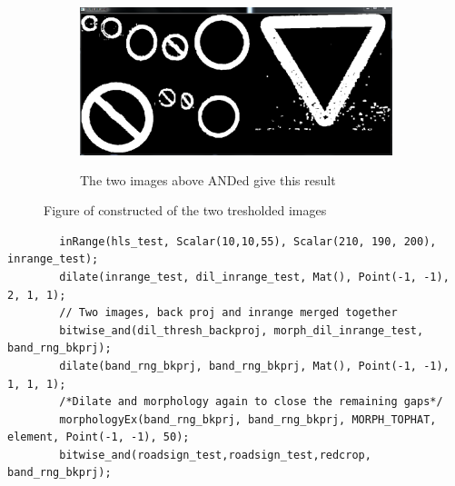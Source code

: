 \documentclass{article}
\begin{document}
\begin{figure}[H]
\center
\begin{subfigure}{0.5\textwidth}
\includegraphics[width=0.9\linewidth, height=5cm]{N_BIT_AND.PNG} 
\caption{The two images above ANDed give this result}
\label{fig:subim1}
\end{subfigure}
\caption{Figure of constructed of the two tresholded images}
\label{fig:image2}
\end{figure}


\begin{lstlisting}
		inRange(hls_test, Scalar(10,10,55), Scalar(210, 190, 200), inrange_test);
		dilate(inrange_test, dil_inrange_test, Mat(), Point(-1, -1), 2, 1, 1);
		// Two images, back proj and inrange merged together
		bitwise_and(dil_thresh_backproj, morph_dil_inrange_test, band_rng_bkprj);
		dilate(band_rng_bkprj, band_rng_bkprj, Mat(), Point(-1, -1), 1, 1, 1);
		/*Dilate and morphology again to close the remaining gaps*/
		morphologyEx(band_rng_bkprj, band_rng_bkprj, MORPH_TOPHAT, element, Point(-1, -1), 50);
		bitwise_and(roadsign_test,roadsign_test,redcrop, band_rng_bkprj);
\end{lstlisting}
\end{document}
